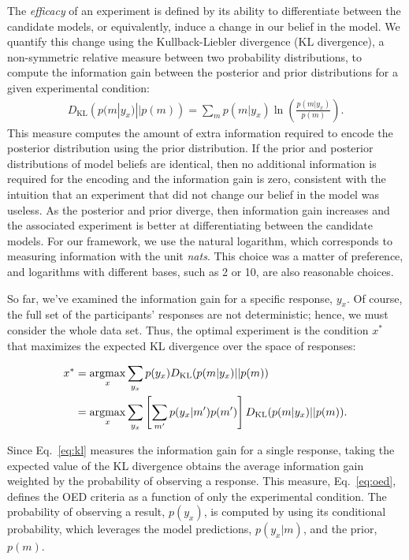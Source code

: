 \documentclass{article}
\newcommand{\argmax}{\operatornamewithlimits{argmax}}
\begin{document}
The \emph{efficacy} of an experiment is defined by its ability to differentiate between the candidate models, or equivalently, induce a change in our belief in the model. We quantify this change using the Kullback-Liebler divergence (KL divergence), a non-symmetric relative measure between two probability distributions, to compute the information gain between the posterior and prior distributions for a given experimental condition:
\begin{align}
D_{\text{KL}}\left(p(m|y_x) || p(m)\right) = \sum\limits_m p(m|y_x) \ln \left( \frac{p(m|y_x)}{p(m)}\right). \label{eq:kl}
\end{align}
This measure computes the amount of extra information required to encode the posterior distribution using the prior distribution. If the prior and posterior distributions of model beliefs are identical, then no additional information is required for the encoding and the information gain is zero, consistent with the intuition that an experiment that did not change our belief in the model was useless. As the posterior and prior diverge, then information gain increases and the associated experiment is better at differentiating between the candidate models. For our framework, we use the natural logarithm, which corresponds to measuring information with the unit \emph{nats}. This choice was a matter of preference, and logarithms with different bases, such as 2 or 10, are also reasonable choices.

So far, we've examined the information gain for a specific response, $y_x$.
Of course, the full set of the participants' responses are not deterministic; hence, we must consider the whole data set.
Thus, the optimal experiment is the condition $x^*$ that maximizes the expected KL divergence over the space of responses:

\begin{align}
x^{*} &= \argmax_{x} \sum\limits_{y_x} p(y_x) D_{\text{KL}}(p(m|y_x) || p(m)) \notag \\
    &= \argmax_{x} \sum\limits_{y_x} \left[\sum\limits_{m'} p(y_x|m')p(m')\right] D_{\text{KL}}(p(m|y_x) || p(m)). \label{eq:oed}
\end{align}

Since Eq.~\ref{eq:kl} measures the information gain for a single response, taking the expected value of the KL divergence obtains the average information gain weighted by the probability of observing a response. This measure, Eq.~\ref{eq:oed}, defines the OED criteria as a function of only the experimental condition. The probability of observing a result, $p(y_x)$, is computed by using its conditional probability, which leverages the model predictions, $p(y_x|m)$, and the prior, $p(m)$.
\end{document}
